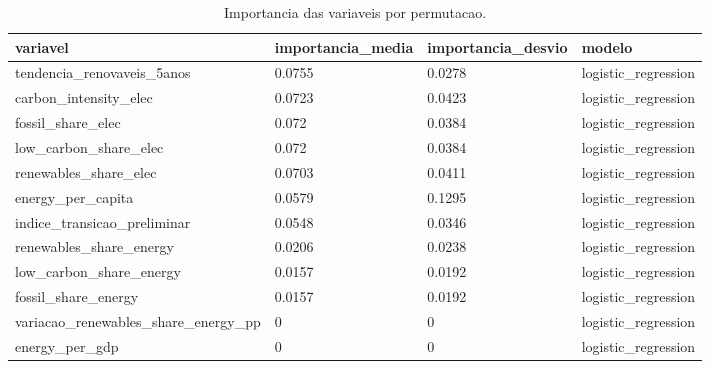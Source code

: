 \begin{table}[htbp]
\centering
\caption{Importancia das variaveis por permutacao.}
\label{tab:importancia-variaveis}
\begin{tabular}{llll}
\hline
variavel & importancia\_media & importancia\_desvio & modelo \\
\hline
tendencia\_renovaveis\_5anos & 0.0755 & 0.0278 & logistic\_regression \\
carbon\_intensity\_elec & 0.0723 & 0.0423 & logistic\_regression \\
fossil\_share\_elec & 0.072 & 0.0384 & logistic\_regression \\
low\_carbon\_share\_elec & 0.072 & 0.0384 & logistic\_regression \\
renewables\_share\_elec & 0.0703 & 0.0411 & logistic\_regression \\
energy\_per\_capita & 0.0579 & 0.1295 & logistic\_regression \\
indice\_transicao\_preliminar & 0.0548 & 0.0346 & logistic\_regression \\
renewables\_share\_energy & 0.0206 & 0.0238 & logistic\_regression \\
low\_carbon\_share\_energy & 0.0157 & 0.0192 & logistic\_regression \\
fossil\_share\_energy & 0.0157 & 0.0192 & logistic\_regression \\
variacao\_renewables\_share\_energy\_pp & 0 & 0 & logistic\_regression \\
energy\_per\_gdp & 0 & 0 & logistic\_regression \\
\hline
\end{tabular}
\end{table}
